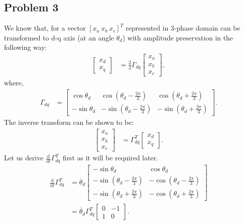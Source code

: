 \subsection*{Problem 3}
We know that, for a vector $[x_a\ x_b\ x_c]^T$ represented in $3$-phase domain can be transformed to d-q axis (at an angle $\theta_d$) with amplitude preservation in the following way:
\begin{align*}
	\begin{bmatrix}
	x_d\\x_q
	\end{bmatrix} &= \frac{2}{3}\Gamma_{dq}\begin{bmatrix}
	x_a\\x_b\\x_c
	\end{bmatrix},
\end{align*}
where,
\begin{align*}
	\Gamma_{dq} &= \begin{bmatrix}
	\cos \theta_d & \cos (\theta_d - \frac{2\pi}{3}) & \cos (\theta_d + \frac{2\pi}{3})\\
	-\sin \theta_d & -\sin (\theta_d - \frac{2\pi}{3}) & -\sin (\theta_d + \frac{2\pi}{3})
	\end{bmatrix}.
\end{align*}
The inverse transform can be shown to be:
\begin{align*}
	\begin{bmatrix}
	x_a\\x_b\\x_c
	\end{bmatrix} &= \Gamma_{dq}^T \begin{bmatrix}
	x_d\\x_q
	\end{bmatrix}.
\end{align*}
Let us derive $\frac{\text{d}}{\text{d}t}\Gamma_{dq}^T$ first as it will be required later.
\begin{align*}
	\frac{\text{d}}{\text{d}t} \Gamma_{dq}^T &= \dot{\theta_d}\begin{bmatrix}
	-\sin \theta_d & \cos \theta_d\\
	-\sin (\theta_d-\frac{2\pi}{3}) & -\cos (\theta_d-\frac{2\pi}{3})\\
	-\sin (\theta_d+\frac{2\pi}{3}) & -\cos (\theta_d+\frac{2\pi}{3}) 
	\end{bmatrix} \\
	&= \dot{\theta_d} \Gamma_{dq}^T \begin{bmatrix}
	0 & -1\\1 & 0
	\end{bmatrix}.
\end{align*}
